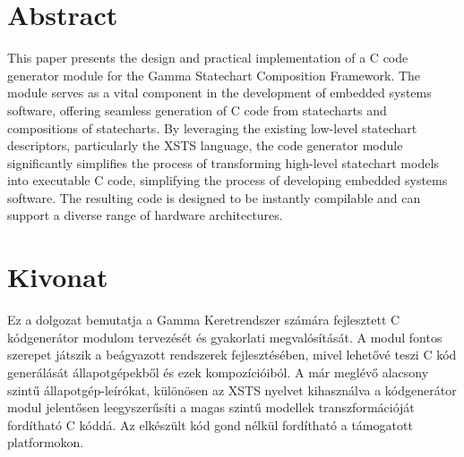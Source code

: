 \setcounter{page}{1}

\chapter*{Abstract}

This paper presents the design and practical implementation of a C code generator module for the Gamma Statechart Composition Framework. The module serves as a vital component in the development of embedded systems software, offering seamless generation of C code from statecharts and compositions of statecharts. By leveraging the existing low-level statechart descriptors, particularly the XSTS language, the code generator module significantly simplifies the process of transforming high-level statechart models into executable C code, simplifying the process of developing embedded systems software. The resulting code is designed to be instantly compilable and can support a diverse range of hardware architectures.

\vfill
\cleardoublepage

\chapter*{Kivonat}

Ez a dolgozat bemutatja a Gamma Keretrendszer számára fejlesztett C kódgenerátor modulom tervezését és gyakorlati megvalósítását. A modul fontos szerepet játszik a beágyazott rendszerek fejlesztésében, mivel lehetővé teszi C kód generálását állapotgépekből és ezek kompozícióiból. A már meglévő alacsony szintű állapotgép-leírókat, különösen az XSTS nyelvet kihasználva a kódgenerátor modul jelentősen leegyszerűsíti a magas szintű modellek transzformációját fordítható C kóddá. Az elkészült kód gond nélkül fordítható a támogatott platformokon.

\vfill
\cleardoublepage

\selectthesislanguage

\setcounter{romanPage}{\value{page}}
